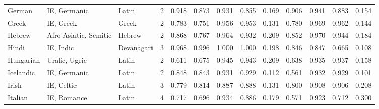 \begin{tabular}{lllrrrrrrrrrr}
                 German &                    IE, Germanic &      Latin &         2 &                       0.918 &                         0.873 &         0.931 &                  0.855 &            0.169 &                         0.906 &         0.941 &                  0.883 &            0.154 \\
                  Greek &                       IE, Greek &      Greek &         2 &                       0.783 &                         0.751 &         0.956 &                  0.953 &            0.131 &                         0.780 &         0.969 &                  0.962 &            0.144 \\
                 Hebrew &           Afro-Asiatic, Semitic &     Hebrew &         2 &                       0.868 &                         0.767 &         0.964 &                  0.932 &            0.209 &                         0.852 &         0.970 &                  0.944 &            0.184 \\
                  Hindi &                       IE, Indic & Devanagari &         3 &                       0.968 &                         0.996 &         1.000 &                  1.000 &            0.198 &                         0.846 &         0.847 &                  0.665 &            0.108 \\
              Hungarian &                   Uralic, Ugric &      Latin &         2 &                       0.611 &                         0.675 &         0.945 &                  0.943 &            0.209 &                         0.638 &         0.935 &                  0.937 &            0.158 \\
              Icelandic &                    IE, Germanic &      Latin &         2 &                       0.848 &                         0.843 &         0.931 &                  0.929 &            0.112 &                         0.561 &         0.932 &                  0.929 &            0.101 \\
                  Irish &                      IE, Celtic &      Latin &         3 &                       0.779 &                         0.814 &         0.887 &                  0.888 &            0.131 &                         0.800 &         0.908 &                  0.906 &            0.208 \\
                Italian &                     IE, Romance &      Latin &         4 &                       0.717 &                         0.696 &         0.934 &                  0.886 &            0.179 &                         0.571 &         0.923 &                  0.712 &            0.300 \\

\end{tabular}

